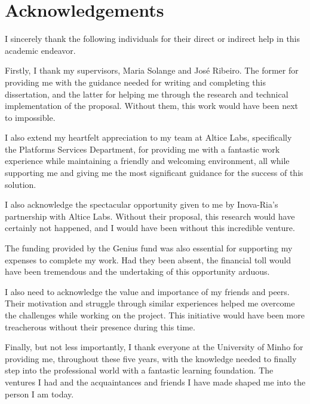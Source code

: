 \chapter*{Acknowledgements}
\setlength{\parskip}{1em}

I sincerely thank the following individuals for their direct or indirect help in this academic endeavor.

Firstly, I thank my supervisors, Maria Solange and José Ribeiro. The former for providing me with the guidance needed for writing and completing this dissertation, and the latter for helping me through the research and technical implementation of the proposal. Without them, this work would have been next to impossible.

I also extend my heartfelt appreciation to my team at Altice Labs, specifically the Platforms Services Department, for providing me with a fantastic work experience while maintaining a friendly and welcoming environment, all while supporting me and giving me the most significant guidance for the success of this solution.

I also acknowledge the spectacular opportunity given to me by Inova-Ria's partnership with Altice Labs. Without their proposal, this research would have certainly not happened, and I would have been without this incredible venture.

The funding provided by the Genius fund was also essential for supporting my expenses to complete my work. Had they been absent, the financial toll would have been tremendous and the undertaking of this opportunity arduous.

I also need to acknowledge the value and importance of my friends and peers. Their motivation and struggle through similar experiences helped me overcome the challenges while working on the project. This initiative would have been more treacherous without their presence during this time.

Finally, but not less importantly, I thank everyone at the University of Minho for providing me, throughout these five years, with the knowledge needed to finally step into the professional world with a fantastic learning foundation. The ventures I had and the acquaintances and friends I have made shaped me into the person I am today.

\setlength{\parskip}{0em}